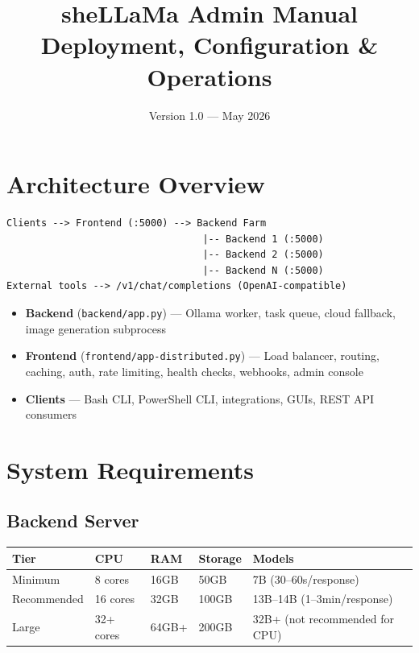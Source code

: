 \documentclass[11pt,a4paper]{article}
\title{\textbf{sheLLaMa Admin Manual}\\[0.5em]\large Deployment, Configuration \& Operations}
\author{Version 1.0 --- May 2026}
\date{}
\begin{document}
\maketitle
\tableofcontents
\newpage

\section{Architecture Overview}

\begin{verbatim}
Clients --> Frontend (:5000) --> Backend Farm
                                  |-- Backend 1 (:5000)
                                  |-- Backend 2 (:5000)
                                  |-- Backend N (:5000)
External tools --> /v1/chat/completions (OpenAI-compatible)
\end{verbatim}

\begin{itemize}
  \item \textbf{Backend} (\texttt{backend/app.py}) --- Ollama worker, task queue, cloud fallback, image generation subprocess
  \item \textbf{Frontend} (\texttt{frontend/app-distributed.py}) --- Load balancer, routing, caching, auth, rate limiting, health checks, webhooks, admin console
  \item \textbf{Clients} --- Bash CLI, PowerShell CLI, integrations, GUIs, REST API consumers
\end{itemize}

\section{System Requirements}

\subsection{Backend Server}
\begin{longtable}{p{3cm}p{2cm}p{2cm}p{2cm}p{5cm}}
\toprule
\textbf{Tier} & \textbf{CPU} & \textbf{RAM} & \textbf{Storage} & \textbf{Models} \\
\midrule
Minimum & 8 cores & 16GB & 50GB & 7B (30--60s/response) \\
Recommended & 16 cores & 32GB & 100GB & 13B--14B (1--3min/response) \\
Large & 32+ cores & 64GB+ & 200GB & 32B+ (not recommended for CPU) \\
\bottomrule
\end{longtable}
\end{document}
